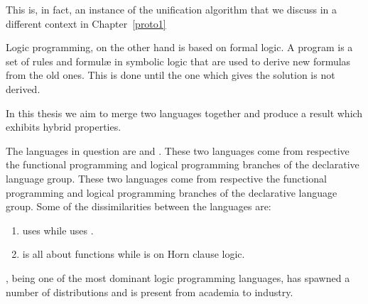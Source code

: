 \documentclass[thesis-solanki.tex]{subfiles}
\begin{document}
This is, in fact, an instance of the unification algorithm that we discuss in a different context in Chapter~\ref{proto1}

Logic programming, \cite{spivey1995introduction} on the other hand is based on formal logic.
A program is a set of rules and formul\ae{} in symbolic logic that are used to derive new formulas from the old
ones.
This is done until the one which gives the solution is not derived.


In this thesis we aim to merge two languages
together and produce a result which exhibits hybrid
properties.

The languages in question are  and . These two languages come from respective the functional programming and logical programming branches of the
    declarative language group.
These two languages come from respective the functional programming and logical programming branches of the declarative language group.
Some of the dissimilarities between the languages are:
\begin{enumerate}
\item {}
  uses  while  uses
  . 
\item {} is all about functions while  is on Horn clause logic.
\end{enumerate} 

 \cite{wikiprolog}, being one of the most dominant logic programming languages, has spawned a
number of distributions and is present from academia to industry.
\end{document}
